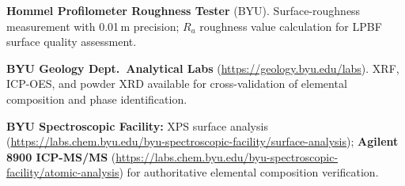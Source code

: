 \documentclass[11pt,letterpaper]{article}
\begin{document}
\smallskip
\noindent
\textbf{Hommel Profilometer Roughness Tester} (BYU).
Surface-roughness measurement with 0.01\,\textmu{}m precision;
$R_a$ roughness value calculation for LPBF surface quality assessment.

\smallskip
\noindent
\textbf{BYU Geology Dept.\ Analytical Labs}
(\url{https://geology.byu.edu/labs}).  XRF, ICP-OES, and powder XRD
available for cross-validation of elemental composition and
phase identification.

\smallskip
\noindent
\textbf{BYU Spectroscopic Facility:} XPS surface analysis
(\url{https://labs.chem.byu.edu/byu-spectroscopic-facility/surface-analysis});
\textbf{Agilent 8900 ICP-MS/MS}
(\url{https://labs.chem.byu.edu/byu-spectroscopic-facility/atomic-analysis})
for authoritative elemental composition verification.
\end{document}

